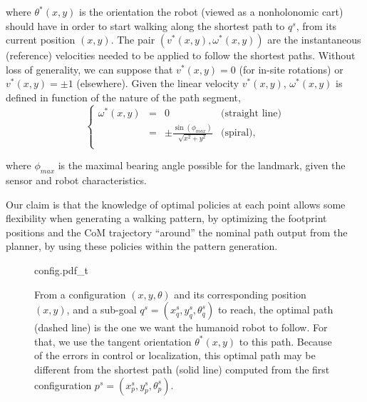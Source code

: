 where $\theta^*(x,y)$ is the orientation the robot (viewed as a nonholonomic cart)  should have in order to start walking along the shortest path to $q^s$, from its current position $(x,y)$. The pair $(v^*(x,y),\omega^*(x,y))$ are the instantaneous (reference) velocities needed to be applied to follow the shortest paths. Without loss of generality, we can suppose that $v^*(x,y)=0$ (for in-site rotations) or $v^*(x,y)=\pm 1$ (elsewhere). Given the linear velocity $v^*(x,y)$, $\omega^*(x,y)$ is defined in function of the nature  of the path segment,
$$
\left\{
\begin{array}{cccc}
 \omega^*(x,y) & = & 0 & \mbox{(straight line)}\\
  & = & \pm\frac{\sin(\phi_{max})}{\sqrt{x^2+y^2}} & \mbox{(spiral)},\\
\end{array}
\right.
$$

where $\phi_{max}$ is the maximal bearing angle possible for the landmark, given the sensor and robot characteristics.

Our claim is that the knowledge of optimal policies at each point allows some flexibility when generating a walking pattern, by optimizing the footprint positions and  the CoM trajectory ``around'' the nominal path output from the planner, by using these policies within the pattern generation.

\begin{figure}[h]
\centering
 
                   {config.pdf_t}
\caption{From a configuration $(x,y,\theta)$ and its corresponding position $(x,y)$, and a sub-goal $q^s= (x_q^s,y_q^s,\theta_q^s)$ to reach, the optimal path (dashed line) is the one we want the humanoid robot to follow. For that, we use the tangent orientation $\theta^*(x,y)$ to this path. Because of the errors in control or localization, this optimal path may be different from the shortest path (solid line) computed from the first configuration $p^s= (x_p^s,y_p^s,\theta_p^s)$.
\label{fig:paths}}
\end{figure}

